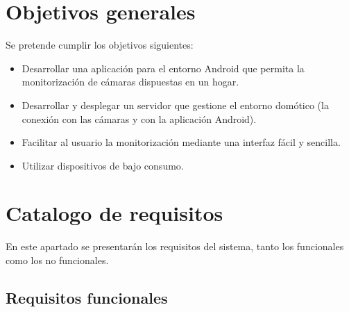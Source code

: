 \section{Objetivos generales}

Se pretende cumplir los objetivos siguientes:

\begin{itemize}
\tightlist
\item
  Desarrollar una aplicación para el entorno Android que permita la monitorización de cámaras dispuestas en un hogar.
\item
  Desarrollar y desplegar un servidor que gestione el entorno domótico (la conexión con las cámaras y con la aplicación Android).
\item
  Facilitar al usuario la monitorización mediante una interfaz fácil y sencilla.
\item
  Utilizar dispositivos de bajo consumo.
\end{itemize}



\section{Catalogo de requisitos}

En este apartado se presentarán los requisitos del sistema, tanto los funcionales como los no funcionales.

\subsection{Requisitos funcionales}

